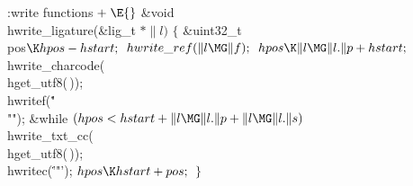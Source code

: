 
\writecode
\Y\B\4:write functions\X${}\mathrel+\E{}$\6
\&{void} \\{hwrite\_ligature}(\&{lig\_t} ${}{*}\|l){}$\1\1\2\2\1\6
\4${}\{{}$\5
\&{uint32\_t} \\{pos}${}\K\index{hpos+\\{hpos}}\\{hpos}-\index{hstart+\\{hstart}}\\{hstart};{}$\7
${}\index{hwrite ref+\\{hwrite\_ref}}\\{hwrite\_ref}(\|l\MG\|f);{}$\6
${}\index{hpos+\\{hpos}}\\{hpos}\K\|l\MG\|l.\|p+\index{hstart+\\{hstart}}\\{hstart};{}$\6
\\{hwrite\_charcode}(\\{hget\_utf8}(\,));\6
\\{hwritef}(\.{"\ \\""});\6
\&{while} ${}(\index{hpos+\\{hpos}}\\{hpos}<\index{hstart+\\{hstart}}\\{hstart}+\|l\MG\|l.\|p+\|l\MG\|l.\|s){}$\1\5
\\{hwrite\_txt\_cc}(\\{hget\_utf8}(\,));\2\6
\\{hwritec}(\.{'"'});\6
${}\index{hpos+\\{hpos}}\\{hpos}\K\index{hstart+\\{hstart}}\\{hstart}+\index{pos+\\{pos}}\\{pos};{}$\6
\4${}\}{}$\2
\Y
\fi

